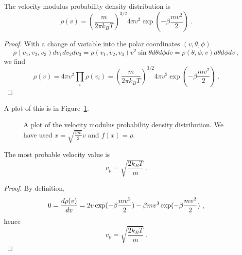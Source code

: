     The velocity modulus probability density distribution is 
    \begin{equation*}
        \rho (v) = (\frac{m}{2\pi k_B T})^{3/2} 4 \pi v^2 \exp(- \beta \frac{m v^2}{2}) ~.
    \end{equation*}
    \begin{proof}
        With a change of variable into the polar coordinates $(v, \theta, \phi)$
        \begin{equation*}
            \rho(v_1, v_2, v_3) dv_1 dv_2 dv_3 = \rho(v_1, v_2, v_3) v^2 \sin \theta d\theta d\phi dv = \rho(\theta, \phi, v) d\theta d\phi dv ~,
        \end{equation*}
        we find
        \begin{equation*}
            \rho(v) = 4 \pi v^2 \prod_i \rho (v_i) = (\frac{m}{2\pi k_B T})^{3/2} 4 \pi v^2 \exp(- \beta \frac{m v^2}{2})  ~.
        \end{equation*}
    \end{proof}
    A plot of this is in Figure~\ref{max:vel}.
    \begin{figure}
        \centering
        \caption{A plot of the velocity modulus probability density distribution. We have used $x = \sqrt{\frac{\beta m}{2}} v$ and $f(x) = \rho$.}
        \label{max:vel}
    \end{figure}

    The most probable velocity value is 
    \begin{equation*}
        v_p = \sqrt{\frac{2 k_B T}{m}} ~.
    \end{equation*}
    \begin{proof}
        By definition, 
        \begin{equation*}
            0 = \frac{d\rho(v)}{dv} = 2 v \exp(- \beta \frac{m v^2}{2}) - \beta m v^3 \exp(- \beta \frac{m v^2}{2}) ~,
        \end{equation*}
        hence 
        \begin{equation*}
            v_p = \sqrt{\frac{2k_B T}{m}} ~.
        \end{equation*}
    \end{proof}

